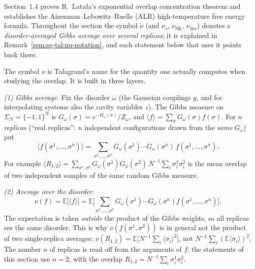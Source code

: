 Section~1.4 proves R.~Lata\l{}a's exponential overlap concentration theorem and establishes the Aizenman--Lebowitz--Ruelle (ALR) high-temperature free energy formula. Throughout the section the symbol $\nu$ (and $\nu_s$, $\nu_{\mathrm{SK}}$, $\nu_{\mathrm{dec}}$) denotes a \emph{disorder-averaged Gibbs average over several replicas}; it is explained in Remark~\ref{rem:sg-tal:nu-notation}, and each statement below that uses it points back there.

\begin{remark}\label{rem:sg-tal:nu-notation}
The symbol $\nu$ is Talagrand's name for the quantity one actually computes when studying the overlap. It is built in three layers.

\emph{(1) Gibbs average.} Fix the disorder $\omega$ (the Gaussian couplings $g$, and for interpolating systems also the cavity variables $z$). The Gibbs measure on $\Sigma_N=\{-1,1\}^N$ is $G_\omega(\sigma)=e^{-H_\omega(\sigma)}/Z_\omega$, and $\langle f\rangle=\sum_\sigma G_\omega(\sigma)f(\sigma)$. For $n$ \emph{replicas} (``real replicas'': $n$ independent configurations drawn from the \emph{same} $G_\omega$) put
\[
\langle f(\sigma^1,\dots,\sigma^n)\rangle=\sum_{\sigma^1,\dots,\sigma^n}G_\omega(\sigma^1)\cdots G_\omega(\sigma^n)\,f(\sigma^1,\dots,\sigma^n).
\]
For example $\langle R_{1,2}\rangle=\sum_{\sigma^1,\sigma^2}G_\omega(\sigma^1)G_\omega(\sigma^2)\,N^{-1}\sum_i\sigma^1_i\sigma^2_i$ is the mean overlap of two independent samples of the same random Gibbs measure.

\emph{(2) Average over the disorder.}
\[
\nu(f)=\mathbb{E}\big[\langle f\rangle\big]=\mathbb{E}\Big[\sum_{\sigma^1,\dots,\sigma^n}G_\omega(\sigma^1)\cdots G_\omega(\sigma^n)f(\sigma^1,\dots,\sigma^n)\Big].
\]
The expectation is taken \emph{outside} the product of the Gibbs weights, so all replicas see the same disorder. This is why $\nu(f(\sigma^1,\sigma^2))$ is in general not the product of two single-replica averages: $\nu(R_{1,2})=\mathbb{E}\big[N^{-1}\sum_i\langle\sigma_i\rangle^2\big]$, not $N^{-1}\sum_i(\mathbb{E}\langle\sigma_i\rangle)^2$. The number $n$ of replicas is read off from the arguments of $f$; the statements of this section use $n=2$, with the overlap $R_{1,2}=N^{-1}\sum_i\sigma^1_i\sigma^2_i$.


\end{remark}
